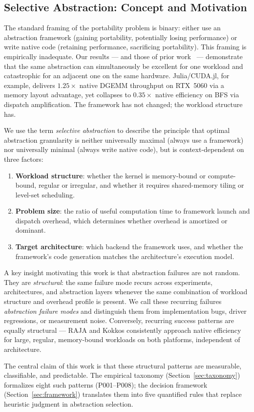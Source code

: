 \subsection{Selective Abstraction: Concept and Motivation}
\label{subsec:selective}

The standard framing of the portability problem is binary: either use an
abstraction framework (gaining portability, potentially losing performance)
or write native code (retaining performance, sacrificing portability). This
framing is empirically inadequate. Our results --- and those of prior
work~\cite{Godoy2023, Evans2022} --- demonstrate that the same abstraction
can simultaneously be excellent for one workload and catastrophic for an
adjacent one on the same hardware. Julia/CUDA.jl, for example, delivers
$1.25\times$ native DGEMM throughput on RTX~5060 via a memory layout
advantage, yet collapses to $0.35\times$ native efficiency on BFS via
dispatch amplification. The framework has not changed; the workload
structure has.

We use the term \emph{selective abstraction} to describe the principle that
optimal abstraction granularity is neither universally maximal (always use a
framework) nor universally minimal (always write native code), but is
context-dependent on three factors:

\begin{enumerate}
    \item \textbf{Workload structure}: whether the kernel is memory-bound or
    compute-bound, regular or irregular, and whether it requires
    shared-memory tiling or level-set scheduling.
    \item \textbf{Problem size}: the ratio of useful computation time to
    framework launch and dispatch overhead, which determines whether overhead
    is amortized or dominant.
    \item \textbf{Target architecture}: which backend the framework uses,
    and whether the framework's code generation matches the architecture's
    execution model.
\end{enumerate}

A key insight motivating this work is that abstraction failures are not
random. They are \emph{structural}: the same failure mode recurs across
experiments, architectures, and abstraction layers whenever the same
combination of workload structure and overhead profile is present. We call
these recurring failures \emph{abstraction failure modes} and distinguish
them from implementation bugs, driver regressions, or measurement noise.
Conversely, recurring success patterns are equally structural --- RAJA and
Kokkos consistently approach native efficiency for large, regular,
memory-bound workloads on both platforms, independent of architecture.

The central claim of this work is that these structural patterns are
measurable, classifiable, and predictable. The empirical taxonomy
(Section~\ref{sec:taxonomy}) formalizes eight such patterns (P001--P008);
the decision framework (Section~\ref{sec:framework}) translates them into
five quantified rules that replace heuristic judgment in abstraction
selection.
